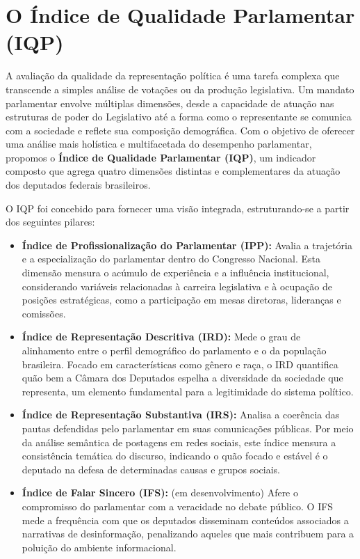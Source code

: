\section{O Índice de Qualidade Parlamentar (IQP)}

A avaliação da qualidade da representação política é uma tarefa complexa que transcende a simples análise de votações ou da produção legislativa. Um mandato parlamentar envolve múltiplas dimensões, desde a capacidade de atuação nas estruturas de poder do Legislativo até a forma como o representante se comunica com a sociedade e reflete sua composição demográfica. Com o objetivo de oferecer uma análise mais holística e multifacetada do desempenho parlamentar, propomos o \textbf{Índice de Qualidade Parlamentar (IQP)}, um indicador composto que agrega quatro dimensões distintas e complementares da atuação dos deputados federais brasileiros.

O IQP foi concebido para fornecer uma visão integrada, estruturando-se a partir dos seguintes pilares:

\begin{itemize}
    \item \textbf{Índice de Profissionalização do Parlamentar (IPP):} Avalia a trajetória e a especialização do parlamentar dentro do Congresso Nacional. Esta dimensão mensura o acúmulo de experiência e a influência institucional, considerando variáveis relacionadas à carreira legislativa e à ocupação de posições estratégicas, como a participação em mesas diretoras, lideranças e comissões.

    \item \textbf{Índice de Representação Descritiva (IRD):} Mede o grau de alinhamento entre o perfil demográfico do parlamento e o da população brasileira. Focado em características como gênero e raça, o IRD quantifica quão bem a Câmara dos Deputados espelha a diversidade da sociedade que representa, um elemento fundamental para a legitimidade do sistema político.

    \item \textbf{Índice de Representação Substantiva (IRS):} Analisa a coerência das pautas defendidas pelo parlamentar em suas comunicações públicas. Por meio da análise semântica de postagens em redes sociais, este índice mensura a consistência temática do discurso, indicando o quão focado e estável é o deputado na defesa de determinadas causas e grupos sociais.

    \item \textbf{Índice de Falar Sincero (IFS):} (em desenvolvimento) Afere o compromisso do parlamentar com a veracidade no debate público. O IFS mede a frequência com que os deputados disseminam conteúdos associados a narrativas de desinformação, penalizando aqueles que mais contribuem para a poluição do ambiente informacional.
\end{itemize}

